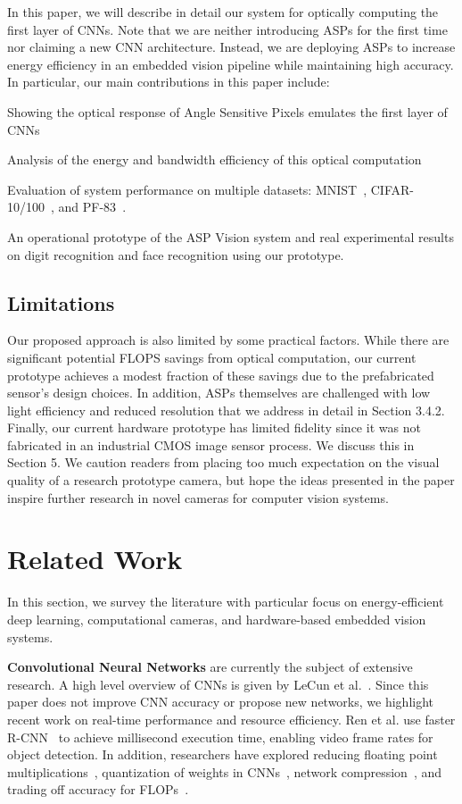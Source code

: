 \documentclass[10pt,twocolumn,letterpaper]{article}
\newcommand{\Section}[1]{\vspace{-4pt}\section{#1}\vspace{-4pt}}
\newcommand{\Subsection}[1]{\vspace{-3pt}\subsection{#1}\vspace{-3pt}}
\newenvironment{tight_itemize}{\begin{itemize}[leftmargin=*] \itemsep
-3pt}{\end{itemize}}
\begin{document}
In this paper, we will describe in detail our system for optically computing the first layer of CNNs. Note that we are neither introducing ASPs for the first time nor claiming a new CNN architecture. Instead, we are deploying ASPs to increase energy efficiency in an embedded vision pipeline while maintaining high accuracy. In particular, our main contributions in this paper include:  
\begin{tight_itemize}
\item{Showing the optical response of Angle Sensitive Pixels emulates the first layer of CNNs } 
\item{Analysis of the energy and bandwidth efficiency of this optical computation} 
\item{Evaluation of system performance on multiple datasets: MNIST~\cite{lecun1998mnist}, CIFAR-10/100~\cite{krizhevsky2009learning}, and PF-83~\cite{becker2013evaluating}.} 
\item{An operational prototype of the ASP Vision system and real experimental results on digit recognition and face recognition using our prototype.} 
\end{tight_itemize}\Subsection{Limitations}
Our proposed approach is also limited by some practical factors. While there are significant potential FLOPS savings from optical computation, our current prototype achieves a modest fraction of these savings due to the prefabricated sensor's design choices. In addition, ASPs themselves are challenged with low light efficiency and reduced resolution that we address in detail in Section 3.4.2. Finally, our current hardware prototype has limited fidelity since it was not fabricated in an industrial CMOS image sensor process. We discuss this in Section 5. We caution readers from placing too much expectation on the visual quality of a research prototype camera, but hope the ideas presented in the paper inspire further research in novel cameras for computer vision systems.


\Section{Related Work}
In this section, we survey the literature with particular focus on energy-efficient deep learning, computational cameras, and hardware-based embedded vision systems.

\textbf{Convolutional Neural Networks} are currently the subject of extensive research. A high level overview of CNNs is given by LeCun et al.~\cite{lecun2015deep}. Since this paper does not improve CNN accuracy or propose new networks, we highlight recent work on real-time performance and resource efficiency. Ren et al. use faster R-CNN~\cite{ren2015faster} to achieve millisecond execution time, enabling video frame rates for object detection. In addition, researchers have explored reducing floating point multiplications~\cite{LinCMB15}, quantization of weights in CNNs~\cite{gong2014compressing, HanMD15}, network compression~\cite{weinbergercompressed2015}, and trading off accuracy for FLOPs~\cite{SchroffKP15}. 
\end{document}
